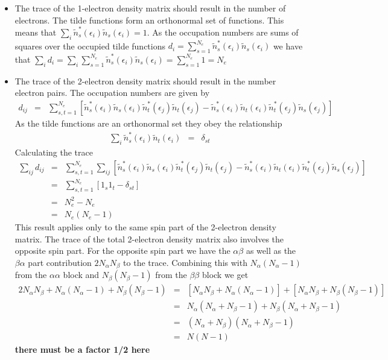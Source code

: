 \documentclass[aip,graphicx]{revtex4-1}
\begin{document}
\begin{itemize}
    \item The trace of the 1-electron density matrix should result in the number of electrons. The tilde functions form an orthonormal set of functions. This means that $\sum_i\tilde{n}^*_s(\epsilon_i)\tilde{n}_s(\epsilon_i) = 1$. As the occupation numbers are sums of squares over the occupied tilde functions $d_i = \sum_{s=1}^{N_e}\tilde{n}^*_s(\epsilon_i)\tilde{n}_s(\epsilon_i)$ we have that $\sum_i d_i = \sum_i\sum_{s=1}^{N_e}\tilde{n}^*_s(\epsilon_i)\tilde{n}_s(\epsilon_i)= \sum_{s=1}^{N_e}1 = N_e$
    \item The trace of the 2-electron density matrix should result in the number electron pairs. The occupation numbers are given by
    \begin{eqnarray}
    \label{Eq:dij}
    d_{ij} &=&
    \sum_{s,t=1}^{N_e}\left[\tilde{n}_s^*(\epsilon_i)\tilde{n}_s(\epsilon_i)\tilde{n}_t^*(\epsilon_j)\tilde{n}_t(\epsilon_j)-\tilde{n}_s^*(\epsilon_i)\tilde{n}_t(\epsilon_i)\tilde{n}_t^*(\epsilon_j)\tilde{n}_s(\epsilon_j)\right]
    \end{eqnarray}
    As the tilde functions are an orthonormal set they obey the relationship
    \begin{eqnarray}
    \sum_i \tilde{n}^*_s(\epsilon_i)\tilde{n}_t(\epsilon_i) &=& \delta_{st}
    \end{eqnarray}
    Calculating the trace
    \begin{eqnarray}
    \sum_{ij}d_{ij} &=& \sum_{s,t=1}^{N_e}\sum_{ij}\left[\tilde{n}_s^*(\epsilon_i)\tilde{n}_s(\epsilon_i)\tilde{n}_t^*(\epsilon_j)\tilde{n}_t(\epsilon_j)-\tilde{n}_s^*(\epsilon_i)\tilde{n}_t(\epsilon_i)\tilde{n}_t^*(\epsilon_j)\tilde{n}_s(\epsilon_j)\right] \nonumber\\
    &=& \sum_{s,t=1}^{N_e} [1_s1_t - \delta_{st}] \nonumber \\
    &=& N_e^2 - N_e \nonumber \\
    &=& N_e(N_e-1)
    \end{eqnarray}
    This result applies only to the same spin part of the 2-electron density matrix. The trace of the total 2-electron density matrix also involves the opposite spin part. For the opposite spin part we have the $\alpha\beta$ as well as the $\beta\alpha$ part contribution $2N_\alpha N_\beta$ to the trace. Combining this with $N_\alpha(N_\alpha-1)$ from the $\alpha\alpha$ block and $N_\beta(N_\beta-1)$ from the $\beta\beta$ block we get
    \begin{eqnarray}
    2N_\alpha N_\beta + N_\alpha(N_\alpha-1) + N_\beta(N_\beta-1) &=& [N_\alpha N_\beta + N_\alpha(N_\alpha-1)] + [N_\alpha N_\beta + N_\beta(N_\beta-1)] \nonumber\\
    &=& N_\alpha(N_\alpha+N_\beta-1) + N_\beta(N_\alpha+N_\beta-1) \nonumber \\
    &=& (N_\alpha+N_\beta)(N_\alpha+N_\beta-1) \nonumber \\
    &=& N(N-1)
    \end{eqnarray}
    {\bf there must be a factor 1/2 here}
\end{itemize}
\end{document}
